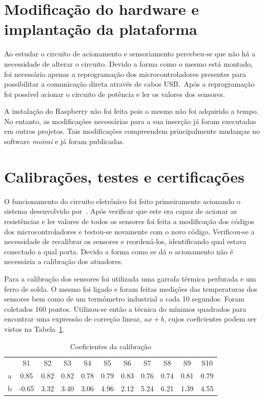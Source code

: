 \section{Modificação do hardware e implantação da plataforma}%
\label{sec:hardware-and-plataform}

Ao estudar o circuito de acionamento e sensoriamento percebeu-se que não há a
necessidade de alterar o circuito. Devido a forma como o mesmo está montado, foi
necessário apenas a reprogramação dos microcontroladores presentes para
possibilitar a comunicação direta através de cabos USB.\ Após a reprogramação
foi possível acionar o circuito de potência e ler os valores dos sensores.

A instalação do Raspberry não foi feita pois o mesmo não foi adquirido a tempo.
No entanto, as modificações necessárias para a sua inserção já foram executadas
em outros projetos. Tais modificações compreendem principalmente mudanças no
software \textit{moirai} e já foram publicadas.

\section{Calibrações, testes e certificações}%
\label{sec:calibration}

O funcionamento do circuito eletrônico foi feito primeiramente acionando o
sistema desenvolvido por~\textcite{masterthesis:nelson}. Após verificar que este
era capaz de acionar as resistências e ler valores de todos os sensores foi
feita a modificação dos códigos dos microcontroladores e testou-se novamente com
o novo código. Verificou-se a necessidade de recalibrar os sensores e
reordená-los, identificando qual estava conectado a qual porta. Devido a forma
como se dá o acionamento não é necessária a calibração dos atuadores.

Para a calibração dos sensores foi utilizada uma garrafa térmica perfurada e um
ferro de solda. O mesmo foi ligado e foram feitas medições das temperaturas dos
sensores bem como de um termômetro industrial a cada 10 segundos. Foram
coletados 160 pontos. Utilizou-se então a técnica do mínimos quadrados para
encontrar uma expressão de correção linear, \( ax+b \), cujos coeficientes podem
ser vistos na Tabela~\ref{tbl:calib-coefs}.

\begin{table}[ht!]
    \centering
    \caption{Coeficientes da calibração}%
    \label{tbl:calib-coefs}
    \begin{tabular}{ccccccccccc}
          & S1    & S2   & S3   & S4   & S5   & S6   & S7   & S8   & S9   & S10  \\
        a & 0.85  & 0.82 & 0.82 & 0.78 & 0.79 & 0.83 & 0.76 & 0.74 & 0.81 & 0.79 \\
        b & -0.65 & 3.32 & 3.40 & 3.06 & 4.96 & 2.12 & 5.24 & 6.21 & 1.39 & 4.55
    \end{tabular}
\end{table}

